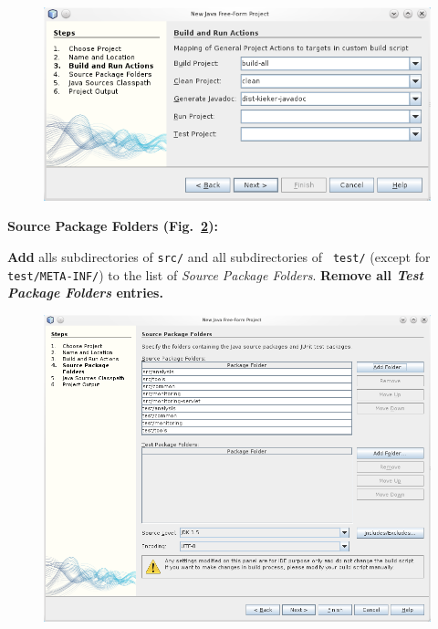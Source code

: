 \begin{compactenum}
\begin{compactenum}
\begin{figure}[H]\centering
\includegraphics[scale=0.4]{figures/netbeans-BuildAndRun}
\caption{}
\label{fig:nb:buildRun}
\end{figure}

\item \textbf{Source Package Folders (Fig.~\ref{fig:nb:sourcePackageFolders}):} %

\textbf{Add} alls subdirectories of \texttt{src/} and all subdirectories of %
\texttt{ test/} (except for \texttt{test/META-INF/}) to the list of %
\textit{Source Package Folders}. %
\textbf{Remove all \textit{Test Package Folders} entries.}

\begin{figure}[H]\centering
\includegraphics[scale=0.4]{figures/netbeans-SourcePackageFolders}
\caption{}
\label{fig:nb:sourcePackageFolders}
\end{figure}


\end{compactenum}
\end{compactenum}
